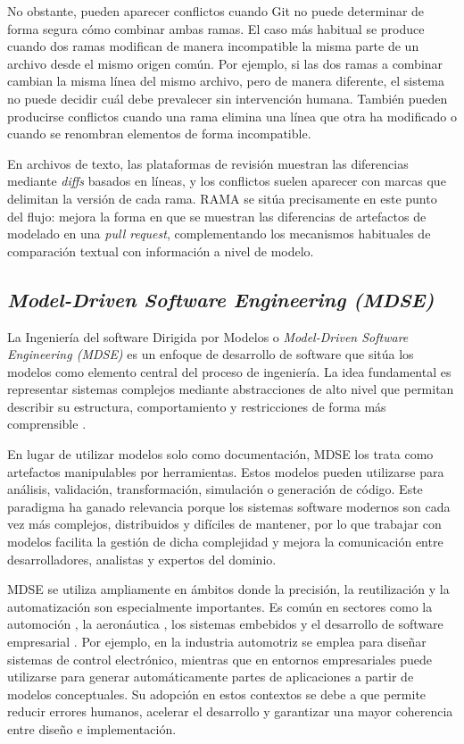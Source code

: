 \documentclass[11pt]{article}
\begin{document}
No obstante, pueden aparecer conflictos cuando Git no puede determinar de forma segura cómo combinar ambas ramas. El caso más habitual se produce cuando dos ramas modifican de manera incompatible la misma parte de un archivo desde el mismo origen común. Por ejemplo, si las dos ramas a combinar cambian la misma línea del mismo archivo, pero de manera diferente, el sistema no puede decidir cuál debe prevalecer sin intervención humana. También pueden producirse conflictos cuando una rama elimina una línea que otra ha modificado o cuando se renombran elementos de forma incompatible.

En archivos de texto, las plataformas de revisión muestran las diferencias mediante \textit{diffs} basados en líneas, y los conflictos suelen aparecer con marcas que delimitan la versión de cada rama. RAMA se sitúa precisamente en este punto del flujo: mejora la forma en que se muestran las diferencias de artefactos de modelado en una \textit{pull request}, complementando los mecanismos habituales de comparación textual con información a nivel de modelo.

\subsection{\textit{Model-Driven Software Engineering (MDSE)}}

La Ingeniería del software Dirigida por Modelos o \textit{Model-Driven Software Engineering (MDSE)} es un enfoque de desarrollo de software que sitúa los modelos como elemento central del proceso de ingeniería. La idea fundamental es representar sistemas complejos mediante abstracciones de alto nivel que permitan describir su estructura, comportamiento y restricciones de forma más comprensible \cite{brambilla-mdse}.

En lugar de utilizar modelos solo como documentación, MDSE los trata como artefactos manipulables por herramientas. Estos modelos pueden utilizarse para análisis, validación, transformación, simulación o generación de código. Este paradigma ha ganado relevancia porque los sistemas software modernos son cada vez más complejos, distribuidos y difíciles de mantener, por lo que trabajar con modelos facilita la gestión de dicha complejidad y mejora la comunicación entre desarrolladores, analistas y expertos del dominio.

MDSE se utiliza ampliamente en ámbitos donde la precisión, la reutilización y la automatización son especialmente importantes. Es común en sectores como la automoción \cite{autosar}, la aeronáutica \cite{ieee-aerospace-mdse}, los sistemas embebidos \cite{mbeddr} y el desarrollo de software empresarial \cite{outsystems}. Por ejemplo, en la industria automotriz se emplea para diseñar sistemas de control electrónico, mientras que en entornos empresariales puede utilizarse para generar automáticamente partes de aplicaciones a partir de modelos conceptuales. Su adopción en estos contextos se debe a que permite reducir errores humanos, acelerar el desarrollo y garantizar una mayor coherencia entre diseño e implementación.
\end{document}
